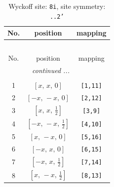 \documentclass[fleqn,8pt]{jsarticle}
\begin{document}
\renewcommand{\arraystretch}{1.2}
\begin{longtable}{ccc}
\caption{Wyckoff site: {\tt 8i}, site symmetry: {\tt ..2'}}
 \\
 \hline \hline
No. & position & mapping \\ \hline \endfirsthead

\multicolumn{2}{l}{\tablename\ \thetable{}} \\
 \hline \hline
No. & position & mapping \\ \hline \endhead

 \hline \hline
\multicolumn{2}{r}{\footnotesize\it continued ...} \\ \endfoot

 \hline \hline
\multicolumn{2}{r}{} \\ \endlastfoot

1 & $\left[ x,\, x,\, 0 \right]$ & {\tt [1,11]} \\ \hline
2 & $\left[ - x,\, - x,\, 0 \right]$ & {\tt [2,12]} \\ \hline
3 & $\left[ x,\, x,\, \frac{1}{2} \right]$ & {\tt [3,9]} \\ \hline
4 & $\left[ - x,\, - x,\, \frac{1}{2} \right]$ & {\tt [4,10]} \\ \hline
5 & $\left[ x,\, - x,\, 0 \right]$ & {\tt [5,16]} \\ \hline
6 & $\left[ - x,\, x,\, 0 \right]$ & {\tt [6,15]} \\ \hline
7 & $\left[ - x,\, x,\, \frac{1}{2} \right]$ & {\tt [7,14]} \\ \hline
8 & $\left[ x,\, - x,\, \frac{1}{2} \right]$ & {\tt [8,13]} \\
\end{longtable}
\renewcommand{\arraystretch}{1.2}
\end{document}
